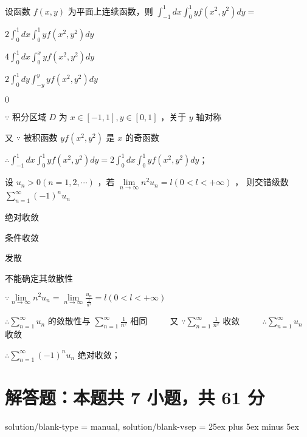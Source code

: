 \begin{question}[points = 3]
    设函数 $f(x, y)$ 为平面上连续函数，则 $\int_{-1}^{1}dx \int_{0}^{1} yf(x^2, y^2)dy = $ \, \paren[A]
\end{question}
\begin{choices}
    \item $2 \int_{0}^{1}dx \int_{0}^{1} yf(x^2, y^2)dy$
    \item $4 \int_{0}^{1}dx \int_{0}^{x} yf(x^2, y^2)dy$
    \item $2 \int_{0}^{1}dy \int_{-y}^{y} yf(x^2, y^2)dy$
    \item $0$
\end{choices}
\begin{solution}
    $\because$ 积分区域 $D$ 为 $x \in [-1 ,1], y \in [0, 1]$ ，关于 $y$ 轴对称

    又 $\because$ 被积函数 $yf(x^2, y^2)$ 是 $x$ 的奇函数

    $\therefore \int_{-1}^{1}dx \int_{0}^{1} yf(x^2, y^2)dy = 2 \int_{0}^{1}dx \int_{0}^{1} yf(x^2, y^2)dy$；
\end{solution}

\begin{question}[points = 3]
    设 $u_n > 0 (n = 1, 2, \cdots)$ ，若 $\lim\limits_{n \to \infty} n^2 u_n = l (0 < l < + \infty)$ ，
    则交错级数 $\sum\limits_{n = 1}^{\infty} (-1)^n u_n$ \, \paren[A]
\end{question}
\begin{choices}
    \item 绝对收敛
    \item 条件收敛
    \item 发散
    \item 不能确定其敛散性
\end{choices}
\begin{solution}
    $\because \lim\limits_{n \to \infty} n^2 u_n = \lim\limits_{n \to \infty} \frac{u_n}{\frac{1}{n^2}} = l (0 < l < + \infty)$

    $\therefore \sum\limits_{n = 1}^{\infty} u_n$ 的敛散性与 $\sum\limits_{n = 1}^{\infty} \frac{1}{n^2}$ 相同 $\qquad$
    又 $\because \sum\limits_{n = 1}^{\infty} \frac{1}{n^2}$ 收敛 $\qquad$
    $\therefore \sum\limits_{n = 1}^{\infty} u_n$ 收敛

    $\therefore \sum\limits_{n = 1}^{\infty} (-1)^n u_n$ 绝对收敛；
\end{solution}

\section{解答题：本题共 7 小题，共 61 分}
\examsetup
{
    solution/blank-type = manual,
    solution/blank-vsep = 25ex plus 5ex minus 5ex
}

